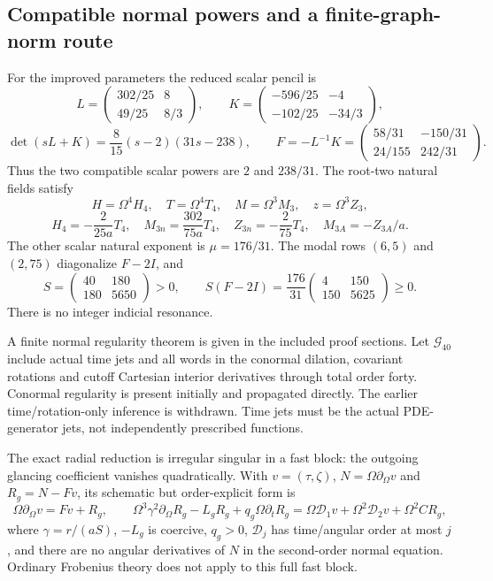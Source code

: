 \documentclass[11pt]{article}
\begin{document}
\subsection{Compatible normal powers and a finite-graph-norm route}
For the improved parameters the reduced scalar pencil is
\[
L=\begin{pmatrix}302/25&8\\49/25&8/3\end{pmatrix},\qquad
K=\begin{pmatrix}-596/25&-4\\-102/25&-34/3\end{pmatrix},
\]
\[
\det(sL+K)=\frac8{15}(s-2)(31s-238),\qquad
F=-L^{-1}K=
\begin{pmatrix}58/31&-150/31\\24/155&242/31\end{pmatrix}.
\]
Thus the two compatible scalar powers are $2$ and $238/31$.
The root-two natural fields satisfy
\[
H=\Omega^4H_4,\quad T=\Omega^4T_4,\quad
M=\Omega^3M_3,\quad z=\Omega^3Z_3,
\]
\[
\boxed{
H_4=-\frac{2}{25a}T_4,\quad
M_{3n}=\frac{302}{75a}T_4,\quad
Z_{3n}=-\frac2{75}T_4,\quad
M_{3A}=-Z_{3A}/a.
}
\]
The other scalar natural exponent is $\mu=176/31$.
The modal rows $(6,5)$ and $(2,75)$ diagonalize $F-2I$,
and
\[
S=\begin{pmatrix}40&180\\180&5650\end{pmatrix}>0,\qquad
S(F-2I)=\frac{176}{31}
\begin{pmatrix}4&150\\150&5625\end{pmatrix}\geq0 .
\]
There is no integer indicial resonance.

A finite normal regularity theorem is given in the included proof sections.
Let $\mathcal G_{40}$ include actual time jets and all words in the
conormal dilation, covariant rotations and cutoff Cartesian interior
derivatives through total order forty. Conormal regularity is present
initially and propagated directly. The earlier time/rotation-only
inference is withdrawn. Time jets must be the actual PDE-generator
jets, not independently prescribed functions.

The exact radial reduction is irregular singular in a fast block:
the outgoing glancing coefficient vanishes quadratically. With
$v=(\tau,\zeta)$, $N=\Omega\partial_\Omega v$ and
$R_g=N-Fv$, its schematic but order-explicit form is
\[
\Omega\partial_\Omega v=Fv+R_g,\qquad
\Omega^3\gamma^2\partial_\Omega R_g-L_g R_g
+q_g\Omega\partial_tR_g
=\Omega\mathcal D_1 v+\Omega^2\mathcal D_2v+
\Omega^2 C R_g ,
\]
where $\gamma=r/(aS)$, $-L_g$ is coercive, $q_g>0$,
$\mathcal D_j$ has time/angular order at most $j$, and there
are no angular derivatives of $N$ in the second-order normal equation.
Ordinary Frobenius theory does not apply to this full fast block.
\end{document}
